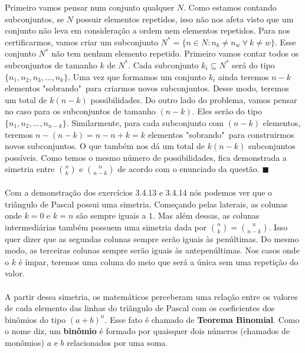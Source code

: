 \documentclass[a4paper,11pt,oneside]{book}
\theoremstyle{definition}
\theoremstyle{break}
\begin{document}
Primeiro vamos pensar num conjunto qualquer $N$. Como estamos contando subconjuntos, se $N$ possuir elementos repetidos, isso não nos afeta visto que um conjunto não leva em consideração a ordem nem elementos repetidos. Para nos certificarmos, vamos criar um subconjunto $N^* = \{n \in N : n_k \neq n_w \ \forall \  k \neq w \}$. Esse conjunto $N^*$ não tem nenhum elemento repetido. Primeiro vamos contar todos os subconjuntos de tamanho $k$ de $N^*$. Cada subconjunto $k_i \subseteq N^*$ será do tipo $\{n_1,n_2,n_3,...,n_k\}$. Uma vez que formamos um conjunto $k_i$ ainda teremos $n - k$ elementos "sobrando"\ para criarmos novos subconjuntos. Desse modo, teremos um total de $k(n-k)$ possibilidades. Do outro lado do problema, vamos pensar no caso para os subconjuntos de tamanho $(n-k)$. Eles serão do tipo $\{n_1,n_2,...,n_{n-k}\}$. Similarmente, para cada subconjunto com $(n-k)$ elementos, teremos $n-(n-k)=n-n+k=k$ elementos "sobrando"\ para construirmos novos subconjuntos. O que também nos dá um total de $k(n-k)$ subconjuntos possíveis. Como temos o mesmo número de possibilidades, fica demonstrada a simetria entre ${n \choose k}$ e ${n \choose n-k}$ de acordo com o enunciado da questão. $\blacksquare$
\\
\\
Com a demonstração dos exercícios 3.4.13 e 3.4.14 nós podemos ver que o triângulo de Pascal possui uma simetria. Começando pelas laterais, as colunas onde $k = 0$ e $k = n$ são sempre iguais a $1$. Mas além dessas, as colunas intermediárias também possuem uma simetria dada por ${n \choose k} = {n \choose n-k}$. Isso quer dizer que as segundas colunas sempre serão iguais às penúltimas. Do mesmo modo, as terceiras colunas sempre serão iguais às antepenúltimas. Nos casos onde o $k$ é ímpar, teremos uma coluna do meio que será a única sem uma repetição do valor.
\\
\\
A partir dessa simetria, os matemáticos perceberam uma relação entre os valores de cada elemento das linhas do triângulo de Pascal com os coeficientes dos binômios do tipo $(a+b)^n$. Esse fato é chamado de \textbf{Teorema Binomial}. Como o nome diz, um \textbf{binômio} é formado por quaisquer dois números (chamados de monômios) $a$ e $b$ relacionados por uma soma.

\pagebreak
\end{document}
